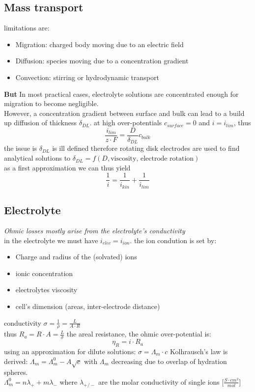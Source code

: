 \documentclass[a4paper,10pt,landscape]{scrartcl}
\begin{document}
\begin{multicols*}{3}
\subsection{Mass transport}
limitations are:
\begin{itemize}
    \item Migration: charged body moving due to an electric field
    \item Diffusion: species moving due to a concentration gradient
    \item Convection: stirring or hydrodynamic transport
\end{itemize}
\textbf{But} In most practical cases, electrolyte solutions are concentrated enough for migration to become negligible. \\
However, a concentration gradient between surface and bulk can lead to a build up diffusion of thickness $\delta_{DL}$. at high over-potentials $c_{surface}=0$ and $i=i_{lim}$, thus
$$\frac{i_{lim}}{z\cdot F}=\frac{D}{\delta_{DL}}c_{bulk}$$
the issue is $\delta_{DL}$ is ill defined therefore rotating disk electrodes are used to find analytical solutions to $\delta_{DL}=f(D,\text{viscosity, electrode rotation})$\\
as a first approximation we can thus yield
$$\frac{1}{i}=\frac{1}{i_{kin}}+\frac{1}{i_{lim}}$$
\subsection{Electrolyte}
\textit{Ohmic losses mostly arise from the electrolyte’s conductivity} \\
in the electrolyte we must have $i_{elec}=i_{ion}$. the ion condution is set by:
\begin{itemize}
    \item Charge and radius of the (solvated) ions
    \item ionic concentration
    \item electrolytes viscosity 
    \item cell's dimension (areas, inter-electrode distance)
\end{itemize}
conductivity $\sigma=\frac{1}{\rho}=\frac{L}{A\cdot R}$ \\
thus $R_a=R\cdot A= \frac{L}{\sigma}$ the areal resistance, the ohmic over-potential is:
$$\eta_R=i\cdot R_a$$
using an approximation for dilute solutions: $\sigma=\Lambda_m\cdot c$
Kolhrausch's law is derived: $\Lambda_m=\Lambda_m^0 - A\sqrt{c}$
with $\Lambda_m$ decreasing due to overlap of hydration spheres. \\
$\Lambda_m^0=n\lambda_+ + m\lambda_-$ where $\lambda_{+/-}$ are the molar conductivity of single ions [$\frac{S\cdot cm^2}{mol}$]


\end{multicols*}
\end{document}
